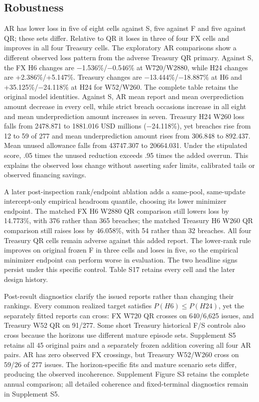 \documentclass[11pt,a4paper]{article}
\begin{document}
\subsection*{Robustness}
AR has lower loss in five of eight cells against S, five against F and five against QR; these sets differ. Relative to QR it loses in three of four FX cells and improves in all four Treasury cells. The exploratory AR comparisons show a different observed loss pattern from the adverse Treasury QR primary. Against S, the FX H6 changes are \(-\)1.536\%/\(-\)0.546\% at W720/W2880, while H24 changes are +2.386\%/+5.147\%. Treasury changes are \(-\)13.444\%/\(-\)18.887\% at H6 and +35.125\%/\(-\)24.118\% at H24 for W52/W260. The complete table retains the original model identities. Against S, AR mean report and mean overprediction amount decrease in every cell, while strict breach occasions increase in all eight and mean underprediction amount increases in seven. Treasury H24 W260 loss falls from 2478.871 to 1881.016 USD millions (\(-\)24.118\%), yet breaches rise from 12 to 59 of 277 and mean underprediction amount rises from 306.848 to 892.437. Mean unused allowance falls from 43747.307 to 20664.031. Under the stipulated score, .05 times the unused reduction exceeds .95 times the added overrun. This explains the observed loss change without asserting safer limits, calibrated tails or observed financing savings.

A later post-inspection rank/endpoint ablation adds a same-pool, same-update intercept-only empirical headroom quantile, choosing its lower minimizer endpoint. The matched FX H6 W2880 QR comparison still lowers loss by 14.773\%, with 376 rather than 365 breaches; the matched Treasury H6 W260 QR comparison still raises loss by 46.058\%, with 54 rather than 32 breaches. All four Treasury QR cells remain adverse against this added report. The lower-rank rule improves on original frozen F in three cells and loses in five, so the empirical minimizer endpoint can perform worse in evaluation. The two headline signs persist under this specific control. Table S17 retains every cell and the later design history.

Post-result diagnostics clarify the issued reports rather than changing their rankings. Every common realized target satisfies \(P(H6)\le P(H24)\), yet the separately fitted reports can cross: FX W720 QR crosses on 640/6,625 issues, and Treasury W52 QR on 91/277. Some short Treasury historical F/S controls also cross because the horizons use different mature episode sets. Supplement S5 retains all 45 original pairs and a separately frozen addition covering all four AR pairs. AR has zero observed FX crossings, but Treasury W52/W260 cross on 59/26 of 277 issues. The horizon-specific fits and mature scenario sets differ, producing the observed incoherence. Supplement Figure S3 retains the complete annual comparison; all detailed coherence and fixed-terminal diagnostics remain in Supplement S5.
\end{document}
